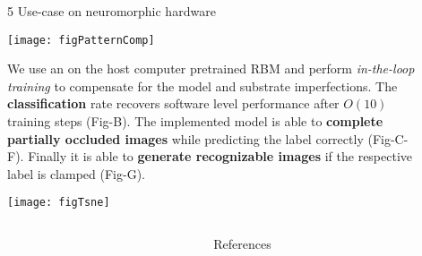 \begin{frame}
\begin{columns}
\begin{column}{0.99\textwidth}
\begin{columns}[t]
\begin{column}{0.32\textwidth}
\begin{block}{\large 5 Use-case on neuromorphic hardware}
					\thirdBlockImSpace
					\begin{center}
						\texttt{[image: figPatternComp]}
					\end{center}
					\thirdBlockImSpace


					\begin{adjustwidth}{1.cm}{1.cm}
					\justify
					We use an on the host computer pretrained RBM and perform \textit{in-the-loop training } to compensate for the model and substrate imperfections.
					The \textbf{classification} rate recovers software level performance after $O(10)$ training steps (Fig-B).
					The implemented model is able to \textbf{complete partially occluded images} while predicting the label correctly (Fig-C-F).
					Finally it is able to \textbf{generate recognizable images} if the respective label is clamped (Fig-G).

					\end{adjustwidth}
					\thirdBlockImSpace
					\begin{center}
						\texttt{[image: figTsne]}
					\end{center}

					
					\blockSpaceTwo
					\end{block}


					\interBlockSpaceTwo




				\end{column}

				\begin{column}{.005\textwidth}\end{column}


			\end{columns}



		\end{column}
		\begin{column}{.005\textwidth}\end{column}
	\end{columns}

	\vspace{-1.0cm}

	\begin{columns}[t]
		\begin{column}{.01\textwidth}\end{column}

		\begin{column}{.98\textwidth}
			\begin{block}{References}
			 \begin{minipage}{0.79\linewidth}
								\tiny
								
								
			 \end{minipage}


\end{block}
\end{column}
\end{columns}
\end{frame}
